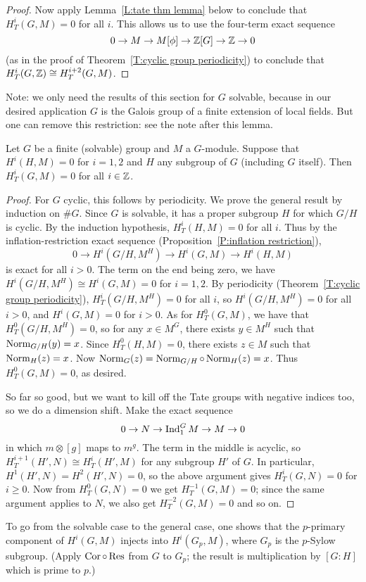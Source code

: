 \begin{proof}
Now apply Lemma~\ref{L:tate thm lemma} below to conclude that $H^i_T(G, M) = 0$ for all $i$.
This allows us to use the four-term exact sequence
\[
0 \to M \to M[\phi] \to \mathbb{Z}[G] \to \mathbb{Z} \to 0
\]
(as in the proof of Theorem~\ref{T:cyclic group periodicity})
to conclude that $H^i_T(G, \mathbb{Z}) \cong H^{i+2}_T(G, M)$.
\end{proof}

Note: we only need the results of this section for $G$ solvable, because
in our desired application $G$ is the Galois group of a finite extension
of local fields. But one can remove this restriction: see the note after
this lemma.
\begin{lemma} \label{L:tate thm lemma}
Let $G$ be a finite (solvable) group and $M$ a $G$-module. Suppose that
$H^i(H,M) =0$ for $i=1,2$ and $H$ any subgroup of $G$ (including $G$
itself). Then $H^i_T(G,M) = 0$ for all $i \in \mathbb{Z}$.
\end{lemma}
\begin{proof}
For $G$ cyclic, this follows by periodicity. We prove the general result
by induction on $\#G$. Since $G$ is solvable, it has a proper subgroup $H$ for which
$G/H$ is cyclic. By the induction hypothesis, $H^i_T(H,M) = 0$ for all
$i$. Thus by the inflation-restriction exact sequence (Proposition~\ref{P:inflation restriction}),
\[
0 \to H^i(G/H, M^H) \to H^i(G, M) \to H^i(H, M)
\]
is exact for all $i>0$. The term on the end being zero, we have
$H^i(G/H, M^H) \cong H^i(G,M) = 0$ for $i=1, 2$. By periodicity (Theorem~\ref{T:cyclic group periodicity}),
$H^i_T(G/H, M^H) = 0$ for all $i$, so $H^i(G/H, M^H) = 0$ for all
$i>0$, and $H^i(G,M) = 0$ for $i>0$. As for $H^0_T(G,M)$, we have that
$H^0_T(G/H, M^H) = 0$, so for any $x \in M^G$, there exists $y \in M^H$
such that $\operatorname{Norm}_{G/H}(y) = x$. Since $H^0_T(H,M) = 0$, there exists
$z \in M$ such that $\operatorname{Norm}_{H}(z) = x$. Now
$\operatorname{Norm}_G(z) = \operatorname{Norm}_{G/H} \circ \operatorname{Norm}_H(z) = x$. Thus
$H^0_T(G,M) = 0$, as desired.

So far so good, but we want to kill off the Tate groups with negative indices
too, so we do a dimension shift. 
Make the exact sequence
\[
0 \to N \to \operatorname{Ind}^G_1 M \to M \to 0
\]
in which $m \otimes [g]$ maps to $m^g$. The term in the middle is acyclic, so
$H^{i+1}_T(H', N) \cong H^{i}_T(H', M)$ for any subgroup $H'$
of $G$. In particular, $H^1(H', N) = 
H^2(H', N) = 0$, so the above argument gives $H^i_T(G, N) = 0$ for $i\geq 0$.
Now from $H^0_T(G, N) = 0$
we get $H^{-1}_T(G, M) = 0$; since the same argument applies to $N$,
we also get $H^{-2}_T(G, M) = 0$ and so on.
\end{proof}
To go from the solvable case to the general case, one shows that
the $p$-primary component of $H^i(G,M)$ injects into $H^i(G_p, M)$,
where $G_p$ is the $p$-Sylow subgroup. (Apply $\operatorname{Cor} \circ \operatorname{Res}$ from
$G$ to $G_p$; the result is multiplication by $[G:H]$ which is prime to
$p$.)

